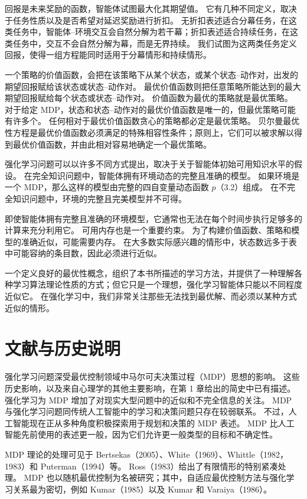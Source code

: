 \documentclass[UTF8,12pt,a4paper,fontset=fandol]{ctexart}
\begin{document}
回报是未来奖励的函数，智能体试图最大化其期望值。
它有几种不同定义，取决于任务性质以及是否希望对延迟奖励进行折扣。
无折扣表述适合分幕任务，在这类任务中，智能体--环境交互会自然分解为若干幕；折扣表述适合持续任务，在这类任务中，交互不会自然分解为幕，而是无界持续。
我们试图为这两类任务定义回报，使得一组方程能同时适用于分幕情形和持续情形。

一个策略的价值函数，会把在该策略下从某个状态，或某个状态--动作对，出发的期望回报赋给该状态或状态--动作对。
最优价值函数则把任意策略所能达到的最大期望回报赋给每个状态或状态--动作对。
价值函数为最优的策略就是最优策略。
对于给定 MDP，状态和状态--动作对的最优价值函数是唯一的，但最优策略可能有许多个。
任何相对于最优价值函数贪心的策略都必定是最优策略。
贝尔曼最优性方程是最优价值函数必须满足的特殊相容性条件；原则上，它们可以被求解以得到最优价值函数，并由此相对容易地确定一个最优策略。

强化学习问题可以以许多不同方式提出，取决于关于智能体初始可用知识水平的假设。
在完全知识问题中，智能体拥有环境动态的完整且准确的模型。
如果环境是一个 MDP，那么这样的模型由完整的四自变量动态函数 $p$（3.2）组成。
在不完全知识问题中，环境的完整且完美模型并不可得。

即使智能体拥有完整且准确的环境模型，它通常也无法在每个时间步执行足够多的计算来充分利用它。
可用内存也是一个重要约束。
为了构建价值函数、策略和模型的准确近似，可能需要内存。
在大多数实际感兴趣的情形中，状态数远多于表中可能容纳的条目数，因此必须进行近似。

一个定义良好的最优性概念，组织了本书所描述的学习方法，并提供了一种理解各种学习算法理论性质的方式；但它只是一个理想，强化学习智能体只能以不同程度近似它。
在强化学习中，我们非常关注那些无法找到最优解、而必须以某种方式近似的情形。

\section*{文献与历史说明}

强化学习问题深受最优控制领域中马尔可夫决策过程（MDP）思想的影响。
这些历史影响，以及来自心理学的其他主要影响，在第 1 章给出的简史中已有描述。
强化学习为 MDP 增加了对现实大型问题中的近似和不完全信息的关注。
MDP 与强化学习问题同传统人工智能中的学习和决策问题只存在较弱联系。
不过，人工智能现在正从多种角度积极探索用于规划和决策的 MDP 表述。
MDP 比人工智能先前使用的表述更一般，因为它们允许更一般类型的目标和不确定性。

MDP 理论的处理可见于 Bertsekas（2005）、White（1969）、Whittle（1982，1983）和 Puterman（1994）等。
Ross（1983）给出了有限情形的特别紧凑处理。
MDP 也以随机最优控制为名被研究；其中，自适应最优控制方法与强化学习关系最为密切，例如 Kumar（1985）以及 Kumar 和 Varaiya（1986）。
\end{document}
